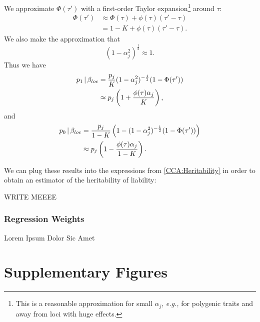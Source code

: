 \documentclass[11pt]{article}
\numberwithin{equation}{section}
\numberwithin{definition}{section}
\numberwithin{thm}{section}
\numberwithin{lemma}{section}
\numberwithin{prop}{section}
\numberwithin{cor}{section}
\numberwithin{hyp}{section}
\begin{document}
We approximate $\Phi(\tau')$ with a first-order Taylor expansion\footnote{
This is a reasonable approximation for small $\alpha_j$, \emph{e.g.,} for polygenic traits
and away from loci with huge effects.}
around $\tau$:
\begin{align*}
	\Phi(\tau') 
&\approx 
	\Phi(\tau) + \phi(\tau)(\tau'-\tau)\\
&=
	1-K + \phi(\tau)(\tau'-\tau).
\end{align*}
We also make the approximation that
$$(1-\alpha_j^2)^{\frac{1}{2}}\approx 1.$$
Thus we have
\begin{align}
\label{taylor1}
\notag
	p_1\,|\,\beta_{loc} 
&= 
	\dfrac{p_j}{K}(1-\alpha_j^2)^{-\frac{1}{2}}(1 - \Phi(\tau'))\\
&\approx
	p_j\left(1+\frac{\phi(\tau)\alpha_j}{K}\right),
\end{align}
and
\begin{align}
\label{taylor2}
\notag
	p_0\,|\,\beta_{loc} 
&=  
	\frac{p_j}{1-K}\left(
		1 - (1-\alpha_j^2)^{-\frac{1}{2}}(1 - \Phi(\tau'))
	\right)\\
&\approx
	p_j\left(1 - \frac{\phi(\tau)\alpha_j}{1-K}\right).
\end{align}

We can plug these results into the expressions from \ref{CCA:Heritability} in order to obtain an estimator of the heritability
of liability:
 
 WRITE MEEEE

\subsubsection{Regression Weights}\label{CCA:Regression Weights}

Lorem Ipsum Dolor Sic Amet



\newpage
\section{Supplementary Figures}
\end{document}
